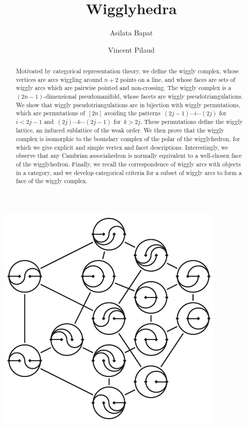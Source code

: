\documentclass{amsart}
\title{Wigglyhedra}
\author{Asilata Bapat}
\author{Vincent Pilaud}
\theoremstyle{definition}
\begin{document}
\begin{abstract}
Motivated by categorical representation theory, we define the wiggly complex, whose vertices are arcs wiggling around $n+2$ points on a line, and whose faces are sets of wiggly arcs which are pairwise pointed and non-crossing. The wiggly complex is a $(2n-1)$-dimensional pseudomanifold, whose facets are wiggly pseudotriangulations. We show that wiggly pseudotriangulations are in bijection with wiggly permutations, which are permutations of~$[2n]$ avoiding the patterns~$(2j-1) \cdots i \cdots (2j)$ for~$i < 2j-1$ and~$(2j) \cdots k \cdots (2j-1)$ for~$k > 2j$. These permutations define the wiggly lattice, an induced sublattice of the weak order. We then prove that the wiggly complex is isomorphic to the boundary complex of the polar of the wigglyhedron, for which we give explicit and simple vertex and facet descriptions. Interestingly, we observe that any Cambrian associahedron is normally equivalent to a well-chosen face of the wigglyhedron. Finally, we recall the correspondence of wiggly arcs with objects in a category, and we develop categorical criteria for a subset of wiggly arcs to form a face of the wiggly complex.
\end{abstract}

\maketitle

\centerline{\includegraphics[scale=1.75]{wigglyFlipGraph}}
\end{document}

